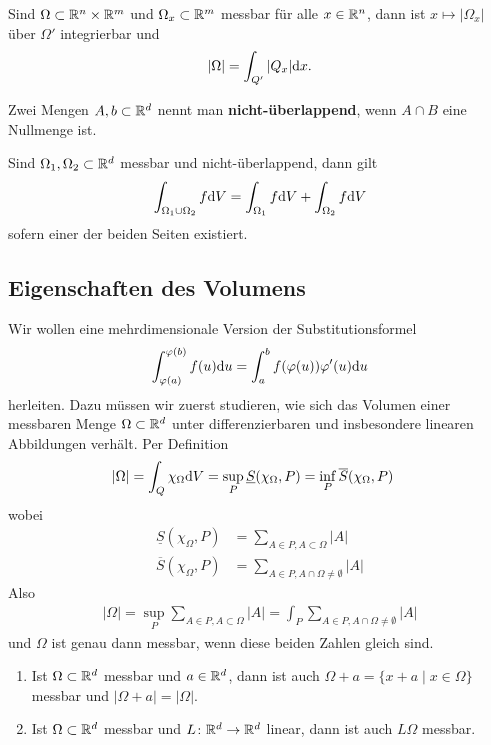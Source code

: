 \begin{kor}\label{kor2_17}
	Sind $\Omega \subset \mathbb{R}^n \times \mathbb{R}^m$ und $\Omega_x \subset \mathbb{R}^m$ messbar für alle $x \in \mathbb{R}^n$, dann ist $x \mapsto |\Omega_x|$ über $\Omega'$ integrierbar und 
	\[|\Omega| = \int_{Q'} |Q_x| \mathrm{d} x.\]
\end{kor}
Zwei Mengen $A,b \subset \mathbb{R}^d$ nennt man \textbf{nicht-überlappend}, wenn $A \cap B$ eine Nullmenge ist.
\begin{satz}\label{satz2_18}
	Sind $\Omega_1, \Omega_2 \subset \mathbb{R}^d$ messbar und nicht-überlappend, dann gilt
	\[\int_{\Omega_1 \cup \Omega_2} f \mathrm{d} V = \int_{\Omega_1} f \mathrm{d} V + \int_{\Omega_2} f \mathrm{d} V\]
	sofern einer der beiden Seiten existiert.
\end{satz}

\subsection{Eigenschaften des Volumens}
Wir wollen eine mehrdimensionale Version der Substitutionsformel
\[\int_{\varphi(a)}^{\varphi(b)} f(u) \mathrm{d} u = \int_a^b f(\varphi(u)) \varphi'(u) \mathrm{d} u\]
herleiten. Dazu müssen wir zuerst studieren, wie sich das Volumen einer messbaren Menge $\Omega \subset \mathbb{R}^d$ unter differenzierbaren und insbesondere linearen Abbildungen verhält. Per Definition
\begin{align*}
	|\Omega| &= \int_Q \chi_\Omega \mathrm{d} V = \sup_P \underline{S}(\chi_\Omega, P) = \inf_P \overline{S}(\chi_\Omega, P)
\end{align*}
wobei 
\begin{align*}
	\underline{S}(\chi_\Omega, P) &= \sum_{A \in P, A\subset\Omega} |A|\\
	\overline{S}(\chi_\Omega, P) &= \sum_{A \in P, A \cap \Omega \neq \emptyset} |A|
\end{align*}
Also
\begin{align*}
	|\Omega| = \sup_P \sum_{A \in P, A \subset \Omega} |A| = \int_P \sum_{A \in P, A \cap \Omega \neq \emptyset} |A|
\end{align*}
und $\Omega$ ist genau dann messbar, wenn diese beiden Zahlen gleich sind.
\begin{rem}
	\begin{enumerate}
		\item Ist $\Omega \subset \mathbb{R}^d$ messbar und $a \in \mathbb{R}^d$, dann ist auch $\Omega + a = \{x + a \mid x \in \Omega\}$ messbar und $|\Omega + a| = |\Omega|$.
		\item Ist $\Omega \subset \mathbb{R}^d$ messbar und $L \colon \mathbb{R}^d \to \mathbb{R}^d$ linear, dann ist auch $L\Omega$ messbar.
	\end{enumerate}
\end{rem}
